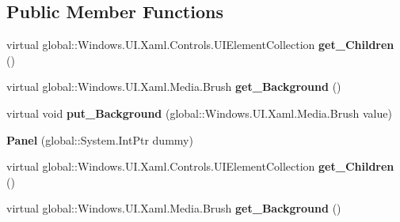 \subsection*{Public Member Functions}
\begin{DoxyCompactItemize}
\item 
\mbox{\label{class_windows_1_1_u_i_1_1_xaml_1_1_controls_1_1_panel_af652e8d7f7eb0e90f25b776e09bf3dcf}} 
virtual global\+::\+Windows.\+U\+I.\+Xaml.\+Controls.\+U\+I\+Element\+Collection {\bfseries get\+\_\+\+Children} ()
\item 
\mbox{\label{class_windows_1_1_u_i_1_1_xaml_1_1_controls_1_1_panel_a61659c9c3ceb21efd89dbd5ddb273f97}} 
virtual global\+::\+Windows.\+U\+I.\+Xaml.\+Media.\+Brush {\bfseries get\+\_\+\+Background} ()
\item 
\mbox{\label{class_windows_1_1_u_i_1_1_xaml_1_1_controls_1_1_panel_a7cc43ef5117674ef84ccfbb8892c77e9}} 
virtual void {\bfseries put\+\_\+\+Background} (global\+::\+Windows.\+U\+I.\+Xaml.\+Media.\+Brush value)
\item 
\mbox{\label{class_windows_1_1_u_i_1_1_xaml_1_1_controls_1_1_panel_a54383ce894f6c3de91f81d884cf66b58}} 
{\bfseries Panel} (global\+::\+System.\+Int\+Ptr dummy)
\item 
\mbox{\label{class_windows_1_1_u_i_1_1_xaml_1_1_controls_1_1_panel_af652e8d7f7eb0e90f25b776e09bf3dcf}} 
virtual global\+::\+Windows.\+U\+I.\+Xaml.\+Controls.\+U\+I\+Element\+Collection {\bfseries get\+\_\+\+Children} ()
\item 
\mbox{\label{class_windows_1_1_u_i_1_1_xaml_1_1_controls_1_1_panel_a61659c9c3ceb21efd89dbd5ddb273f97}} 
virtual global\+::\+Windows.\+U\+I.\+Xaml.\+Media.\+Brush {\bfseries get\+\_\+\+Background} ()
\item 
\mbox{\label{class_windows_1_1_u_i_1_1_xaml_1_1_controls_1_1_panel_a7cc43ef5117674ef84ccfbb8892c77e9}} 

\end{DoxyCompactItemize}
